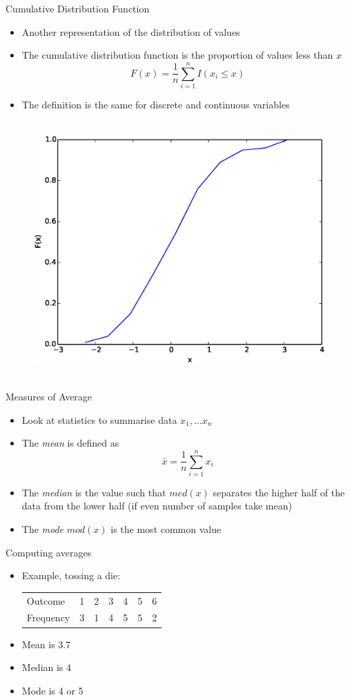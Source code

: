 \documentclass{beamer}
\begin{document}
\begin{frame}{Cumulative Distribution Function}  
\begin{itemize} 
 \item Another representation of the distribution of values 
\item The cumulative distribution function is the proportion of values less than $x$
\begin{displaymath}
 F(x) = \frac{1}{n}\sum_{i=1}^n I(x_i \leq x)
\end{displaymath}
\item The definition is the same for discrete and continuous variables 
\end{itemize}
 \begin{figure}[htp]
\mbox{
\includegraphics[width=0.5\linewidth]{ContinuousCDF.eps}
}
\end{figure} 
\end{frame}

\begin{frame}{Measures of Average}
\begin{itemize} 
 \item Look at statistics to summarise data $x_1, \ldots x_n$
  \item The \emph{mean} is defined as 
  \begin{displaymath}
   \bar{x} = \frac{1}{n}\sum_{i=1}^n x_i
  \end{displaymath}
\item The \emph{median} is the value such that $med(x)$ separates the higher half of the data from the lower half (if even number of samples take mean) 
\item The \emph{mode} $mod(x)$ is the most common value  
\end{itemize}
\end{frame}

\begin{frame}{Computing averages} 
 \begin{itemize} 
  \item Example, tossing a die: 
\begin{table}
  \begin{tabular}{l | l l l l l l }
\hline 
  Outcome & 1 & 2 & 3 & 4 & 5 & 6 \\ 
  Frequency & 3 & 1 & 4 & 5 & 5 & 2 \\
\hline 
  \end{tabular} 
\end{table}
  \item Mean is 3.7 
  \item Median is 4 
  \item Mode is 4 or 5 
 \end{itemize}
\end{frame}
\end{document}
